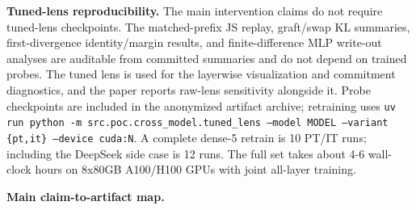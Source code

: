 \documentclass[11pt]{article}
\begin{document}
\textbf{Tuned-lens reproducibility.} The main intervention claims do not require tuned-lens checkpoints. The matched-prefix JS replay, graft/swap KL summaries, first-divergence identity/margin results, and finite-difference MLP write-out analyses are auditable from committed summaries and do not depend on trained probes. The tuned lens is used for the layerwise visualization and commitment diagnostics, and the paper reports raw-lens sensitivity alongside it. Probe checkpoints are included in the anonymized artifact archive; retraining uses \texttt{uv run python -m src.poc.cross\_model.tuned\_lens --model MODEL --variant \{pt,it\} --device cuda:N}. A complete dense-5 retrain is 10 PT/IT runs; including the DeepSeek side case is 12 runs. The full set takes about 4-6 wall-clock hours on 8x80GB A100/H100 GPUs with joint all-layer training.

\textbf{Main claim-to-artifact map.}
\end{document}
